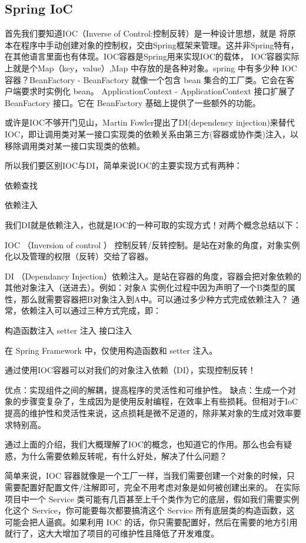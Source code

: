 \documentclass[../../../interview-questions.tex]{subfiles}
\begin{document}
\subsection{Spring IoC}

首先我们要知道IOC（Inverse of Control:控制反转）是一种设计思想，就是 将原本在程序中手动创建对象的控制权，交由Spring框架来管理。这并非Spring特有，在其他语言里面也有体现。IOC容器是Spring用来实现IOC的载体， IOC容器实际上就是个Map（key，value）,Map 中存放的是各种对象。spring 中有多少种 IOC 容器？BeanFactory - BeanFactory 就像一个包含 bean 集合的工厂类。它会在客户端要求时实例化 bean。
ApplicationContext - ApplicationContext 接口扩展了 BeanFactory 接口。它在 BeanFactory 基础上提供了一些额外的功能。

或许是IOC不够开门见山，Martin Fowler提出了DI(dependency injection)来替代IOC，即让调用类对某一接口实现类的依赖关系由第三方(容器或协作类)注入，以移除调用类对某一接口实现类的依赖。

所以我们要区别IOC与DI，简单来说IOC的主要实现方式有两种：

依赖查找

依赖注入

我们DI就是依赖注入，也就是IOC的一种可取的实现方式！对两个概念总结以下：

IOC （Inversion of control ） 控制反转/反转控制。是站在对象的角度，对象实例化以及管理的权限（反转）交给了容器。

DI （Dependancy Injection）依赖注入。是站在容器的角度，容器会把对象依赖的其他对象注入（送进去）。例如：对象A 实例化过程中因为声明了一个B类型的属性，那么就需要容器把B对象注入到A中。可以通过多少种方式完成依赖注入？
通常，依赖注入可以通过三种方式完成，即：

构造函数注入
setter 注入
接口注入

在 Spring Framework 中，仅使用构造函数和 setter 注入。

通过使用IOC容器可以对我们的对象注入依赖（DI），实现控制反转！

优点：实现组件之间的解耦，提高程序的灵活性和可维护性。
缺点：生成一个对象的步骤变复杂了，生成因为是使用反射编程，在效率上有些损耗。但相对于IoC提高的维护性和灵活性来说，这点损耗是微不足道的，除非某对象的生成对效率要求特别高。

通过上面的介绍，我们大概理解了IOC的概念，也知道它的作用。那么也会有疑惑，为什么需要依赖反转呢，有什么好处，解决了什么问题？

简单来说，IOC 容器就像是一个工厂一样，当我们需要创建一个对象的时候，只需要配置好配置文件/注解即可，完全不用考虑对象是如何被创建出来的。 在实际项目中一个 Service 类可能有几百甚至上千个类作为它的底层，假如我们需要实例化这个 Service，你可能要每次都要搞清这个 Service 所有底层类的构造函数，这可能会把人逼疯。如果利用 IOC 的话，你只需要配置好，然后在需要的地方引用就行了，这大大增加了项目的可维护性且降低了开发难度。
\end{document}
